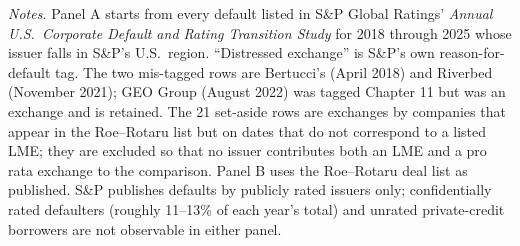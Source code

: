 \begin{table}[htbp]
\begin{minipage}{0.95\textwidth}
\vspace{4pt}\footnotesize
\textit{Notes.} Panel A starts from every default listed in S\&P Global Ratings' \textit{Annual U.S.\ Corporate Default and Rating Transition Study} for 2018 through 2025 whose issuer falls in S\&P's U.S.\ region. ``Distressed exchange'' is S\&P's own reason-for-default tag. The two mis-tagged rows are Bertucci's (April 2018) and Riverbed (November 2021); GEO Group (August 2022) was tagged Chapter 11 but was an exchange and is retained. The 21 set-aside rows are exchanges by companies that appear in the Roe--Rotaru list but on dates that do not correspond to a listed LME; they are excluded so that no issuer contributes both an LME and a pro rata exchange to the comparison. Panel B uses the Roe--Rotaru deal list as published. S\&P publishes defaults by publicly rated issuers only; confidentially rated defaulters (roughly 11--13\% of each year's total) and unrated private-credit borrowers are not observable in either panel.
\end{minipage}
\end{table}
